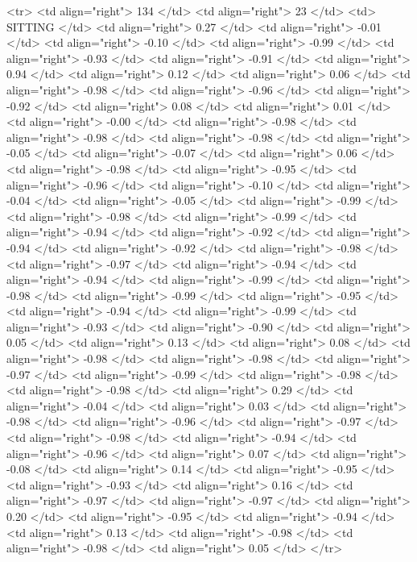   <tr> <td align="right"> 134 </td> <td align="right">  23 </td> <td> SITTING </td> <td align="right"> 0.27 </td> <td align="right"> -0.01 </td> <td align="right"> -0.10 </td> <td align="right"> -0.99 </td> <td align="right"> -0.93 </td> <td align="right"> -0.91 </td> <td align="right"> 0.94 </td> <td align="right"> 0.12 </td> <td align="right"> 0.06 </td> <td align="right"> -0.98 </td> <td align="right"> -0.96 </td> <td align="right"> -0.92 </td> <td align="right"> 0.08 </td> <td align="right"> 0.01 </td> <td align="right"> -0.00 </td> <td align="right"> -0.98 </td> <td align="right"> -0.98 </td> <td align="right"> -0.98 </td> <td align="right"> -0.05 </td> <td align="right"> -0.07 </td> <td align="right"> 0.06 </td> <td align="right"> -0.98 </td> <td align="right"> -0.95 </td> <td align="right"> -0.96 </td> <td align="right"> -0.10 </td> <td align="right"> -0.04 </td> <td align="right"> -0.05 </td> <td align="right"> -0.99 </td> <td align="right"> -0.98 </td> <td align="right"> -0.99 </td> <td align="right"> -0.94 </td> <td align="right"> -0.92 </td> <td align="right"> -0.94 </td> <td align="right"> -0.92 </td> <td align="right"> -0.98 </td> <td align="right"> -0.97 </td> <td align="right"> -0.94 </td> <td align="right"> -0.94 </td> <td align="right"> -0.99 </td> <td align="right"> -0.98 </td> <td align="right"> -0.99 </td> <td align="right"> -0.95 </td> <td align="right"> -0.94 </td> <td align="right"> -0.99 </td> <td align="right"> -0.93 </td> <td align="right"> -0.90 </td> <td align="right"> 0.05 </td> <td align="right"> 0.13 </td> <td align="right"> 0.08 </td> <td align="right"> -0.98 </td> <td align="right"> -0.98 </td> <td align="right"> -0.97 </td> <td align="right"> -0.99 </td> <td align="right"> -0.98 </td> <td align="right"> -0.98 </td> <td align="right"> 0.29 </td> <td align="right"> -0.04 </td> <td align="right"> 0.03 </td> <td align="right"> -0.98 </td> <td align="right"> -0.96 </td> <td align="right"> -0.97 </td> <td align="right"> -0.98 </td> <td align="right"> -0.94 </td> <td align="right"> -0.96 </td> <td align="right"> 0.07 </td> <td align="right"> -0.08 </td> <td align="right"> 0.14 </td> <td align="right"> -0.95 </td> <td align="right"> -0.93 </td> <td align="right"> 0.16 </td> <td align="right"> -0.97 </td> <td align="right"> -0.97 </td> <td align="right"> 0.20 </td> <td align="right"> -0.95 </td> <td align="right"> -0.94 </td> <td align="right"> 0.13 </td> <td align="right"> -0.98 </td> <td align="right"> -0.98 </td> <td align="right"> 0.05 </td> </tr>
